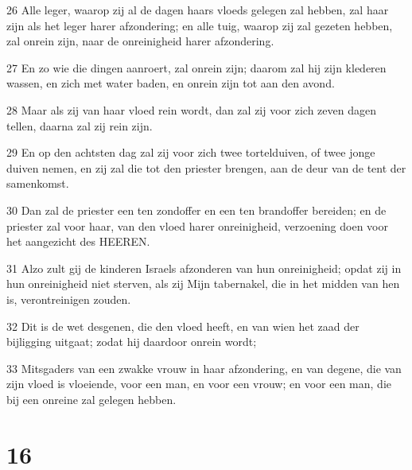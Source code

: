 \par 26 Alle leger, waarop zij al de dagen haars vloeds gelegen zal hebben, zal haar zijn als het leger harer afzondering; en alle tuig, waarop zij zal gezeten hebben, zal onrein zijn, naar de onreinigheid harer afzondering.
\par 27 En zo wie die dingen aanroert, zal onrein zijn; daarom zal hij zijn klederen wassen, en zich met water baden, en onrein zijn tot aan den avond.
\par 28 Maar als zij van haar vloed rein wordt, dan zal zij voor zich zeven dagen tellen, daarna zal zij rein zijn.
\par 29 En op den achtsten dag zal zij voor zich twee tortelduiven, of twee jonge duiven nemen, en zij zal die tot den priester brengen, aan de deur van de tent der samenkomst.
\par 30 Dan zal de priester een ten zondoffer en een ten brandoffer bereiden; en de priester zal voor haar, van den vloed harer onreinigheid, verzoening doen voor het aangezicht des HEEREN.
\par 31 Alzo zult gij de kinderen Israels afzonderen van hun onreinigheid; opdat zij in hun onreinigheid niet sterven, als zij Mijn tabernakel, die in het midden van hen is, verontreinigen zouden.
\par 32 Dit is de wet desgenen, die den vloed heeft, en van wien het zaad der bijligging uitgaat; zodat hij daardoor onrein wordt;
\par 33 Mitsgaders van een zwakke vrouw in haar afzondering, en van degene, die van zijn vloed is vloeiende, voor een man, en voor een vrouw; en voor een man, die bij een onreine zal gelegen hebben.

\chapter{16}

